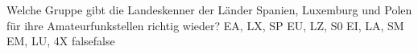     {Welche Gruppe gibt die Landeskenner der Länder Spanien, Luxemburg und Polen für ihre Amateurfunkstellen richtig wieder?}
    {EA, LX, SP}
    {EU, LZ, S0}
    {EI, LA, SM}
    {EM, LU, 4X}
    {false}{false}
